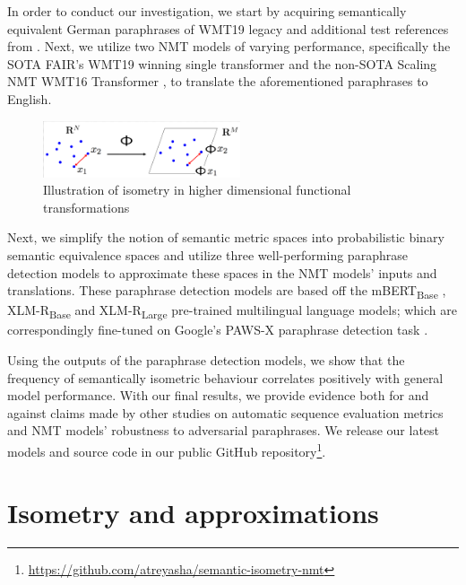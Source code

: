 \documentclass[11pt,a4paper]{article}
\begin{document}
In order to conduct our investigation, we start by acquiring semantically equivalent German paraphrases of WMT19 legacy and additional test references from \citet{freitag-bleu-paraphrase-references-2020}. Next, we utilize two NMT models of varying performance, specifically the SOTA FAIR's WMT19 winning single transformer \cite{ng2019facebook} and the non-SOTA Scaling NMT WMT16 Transformer \cite{ott2018scaling}, to translate the aforementioned paraphrases to English.

\begin{figure}
  \centering
  \includegraphics[trim={1.0cm 0cm 0cm 1.0cm},clip,width=0.52\textwidth]{isometry_visualized.png}
  \caption{Illustration of isometry in higher dimensional functional transformations \citep{Hegde-Numax}}
  \label{isometry_visual}
\end{figure}

Next, we simplify the notion of semantic metric spaces into probabilistic binary semantic equivalence spaces and utilize three well-performing paraphrase detection models to approximate these spaces in the NMT models' inputs and translations. These paraphrase detection models are based off the mBERT\textsubscript{Base} \cite{devlin-etal-2019-bert}, XLM-R\textsubscript{Base} \cite{conneau2019unsupervised} and XLM-R\textsubscript{Large} \cite{conneau2019unsupervised} pre-trained multilingual language models; which are correspondingly fine-tuned on Google's PAWS-X paraphrase detection task \cite{pawsx2019emnlp, hu2020xtreme}.
 
Using the outputs of the paraphrase detection models, we show that the frequency of semantically isometric behaviour correlates positively with general model performance. With our final results, we provide evidence both for and against claims made by other studies on automatic sequence evaluation metrics and NMT models' robustness to adversarial paraphrases. We release our latest models and source code in our public GitHub repository\footnote{\url{https://github.com/atreyasha/semantic-isometry-nmt}}.

\section{Isometry and approximations}
\end{document}
